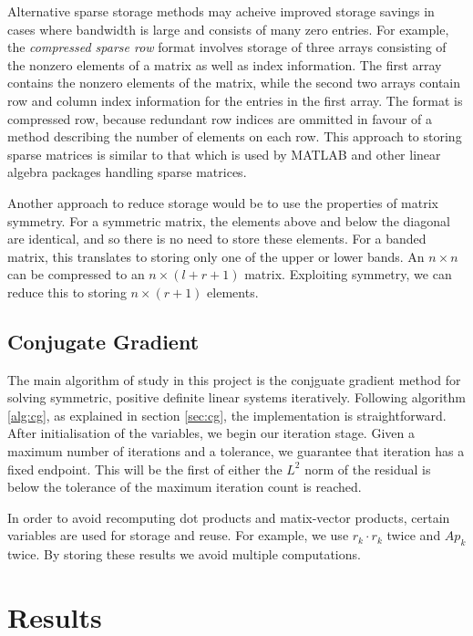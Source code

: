 Alternative sparse storage methods may acheive improved storage savings in cases where bandwidth is large and consists of many zero entries.
For example, the \textit{compressed sparse row} format involves storage of three arrays consisting of the nonzero elements of a matrix as well as index information.
The first array contains the nonzero elements of the matrix, while the second two arrays contain row and column index information for the entries in the first array.
The format is compressed row, because redundant row indices are ommitted in favour of a method describing the number of elements on each row.
This approach to storing sparse matrices is similar to that which is used by MATLAB and other linear algebra packages handling sparse matrices.

Another approach to reduce storage would be to use the properties of matrix symmetry. 
For a symmetric matrix, the elements above and below the diagonal are identical, and so there is no need to store these elements.
For a banded matrix, this translates to storing only one of the upper or lower bands.
An $n\times n$  can be compressed to an $n \times (l+r+1)$ matrix.
Exploiting symmetry, we can reduce this to storing $n \times (r+1)$ elements.


\subsection{Conjugate Gradient}

The main algorithm of study in this project is the conjguate gradient method for solving symmetric, positive definite linear systems iteratively.
Following algorithm \ref{alg:cg}, as explained in section \ref{sec:cg}, the implementation is straightforward.
After initialisation of the variables, we begin our iteration stage. 
Given a maximum number of iterations and a tolerance, we guarantee that iteration has a fixed endpoint.
This will be the first of either the $L^{2}$ norm of the residual is below the tolerance of the maximum iteration count is reached.

In order to avoid recomputing dot products and matix-vector products, certain variables are used for storage and reuse.
For example, we use $r_k \cdot r_k$ twice and $A p_k$ twice. By storing these results we avoid multiple computations.


\section{Results}

